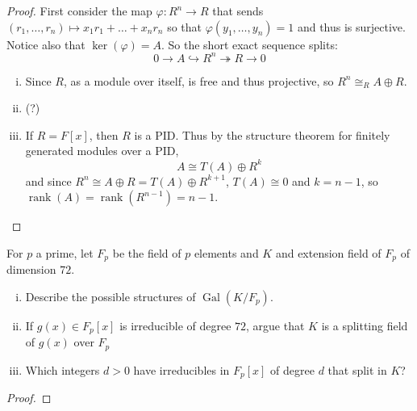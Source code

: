\documentclass{article}
\newenvironment{problem}[2][Problem]{\begin{trivlist}
\item[\hskip \labelsep {\bfseries #1}\hskip \labelsep {\bfseries #2.}]}{\end{trivlist}}
\newcommand{\rank}{\operatorname{rank}}
\newcommand{\Gal}{\operatorname{Gal}}
\newcommand{\fn}[3]{{#1 \colon #2 \rightarrow #3}}
\begin{document}
\begin{proof}
  First consider the map $\fn \varphi {R^n} R$ that sends
  $(r_1, \hdots, r_n) \mapsto x_1r_1 + \hdots + x_nr_n$ so that
  $\varphi(y_1, \hdots, y_n) = 1$ and thus is surjective.
  Notice also that $\ker(\varphi) = A$. So the short exact sequence splits:
  \[
    0 \rightarrow A \hookrightarrow R^n \twoheadrightarrow R \rightarrow 0
  \]
  \begin{enumerate}[(i)]
    \item Since $R$, as a module over itself, is free and thus projective,
      so $R^n \cong_R A \oplus R$.
    \item (?)
    \item If $R = F[x]$, then $R$ is a PID. Thus by the
    structure theorem for finitely generated modules over a PID, \[
      A \cong T(A) \oplus R^k
    \] and since $R^n \cong A \oplus R = T(A) \oplus R^{k+1}$, $T(A) \cong 0$
    and $k = n - 1$, so $\rank(A) = \rank(R^{n-1}) = n - 1$.
  \end{enumerate}

\end{proof}
\pagebreak

\begin{problem}{6}
  For $p$ a prime, let $F_p$ be the field of $p$ elements and $K$ and extension
  field of $F_p$ of dimension $72$. \begin{enumerate}[(i)]
    \item Describe the possible structures of $\Gal(K/F_p)$.
    \item If $g(x) \in F_p[x]$ is irreducible of degree $72$, argue that $K$ is
      a splitting field of $g(x)$ over $F_p$
    \item Which integers $d > 0$ have irreducibles in $F_p[x]$ of degree $d$
      that split in $K$?
  \end{enumerate}
\end{problem}

\begin{proof}
\end{proof}
\end{document}
